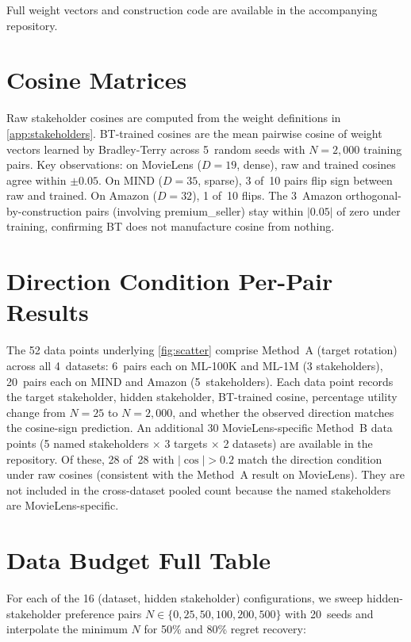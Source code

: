 \documentclass[11pt,letterpaper]{article}
\begin{document}
Full weight vectors and construction code are available in the
accompanying repository.

\section{Cosine Matrices}
\label{app:cosines}

Raw stakeholder cosines are computed from the weight definitions in
\cref{app:stakeholders}. BT-trained cosines are the mean pairwise
cosine of weight vectors learned by Bradley-Terry across 5~random
seeds with $N = 2{,}000$ training pairs.
Key observations: on MovieLens ($D{=}19$, dense), raw and trained
cosines agree within $\pm 0.05$. On MIND ($D{=}35$, sparse), 3
of~10 pairs flip sign between raw and trained. On Amazon ($D{=}32$),
1 of~10 flips. The 3~Amazon orthogonal-by-construction pairs
(involving premium\_seller) stay within $|0.05|$ of zero under
training, confirming BT does not manufacture cosine from nothing.

\section{Direction Condition Per-Pair Results}
\label{app:direction_pairs}

The 52 data points underlying \cref{fig:scatter} comprise Method~A
(target rotation) across all 4~datasets: 6~pairs each on ML-100K and
ML-1M (3 stakeholders), 20~pairs each on MIND and Amazon
(5~stakeholders). Each data point records the target stakeholder,
hidden stakeholder, BT-trained cosine, percentage utility change from
$N = 25$ to $N = 2{,}000$, and whether the observed direction matches
the cosine-sign prediction. An additional 30 MovieLens-specific Method~B data points (5 named
stakeholders $\times$ 3 targets $\times$ 2 datasets) are available
in the repository. Of these, 28 of~28 with $|\cos| > 0.2$ match the
direction condition under raw cosines (consistent with the Method~A
result on MovieLens). They are not included in the cross-dataset
pooled count because the named stakeholders are MovieLens-specific.

\section{Data Budget Full Table}
\label{app:data_budget}

For each of the 16 (dataset, hidden stakeholder) configurations, we
sweep hidden-stakeholder preference pairs
$N \in \{0, 25, 50, 100, 200, 500\}$ with 20~seeds and interpolate
the minimum $N$ for 50\% and 80\% regret recovery:
\end{document}

